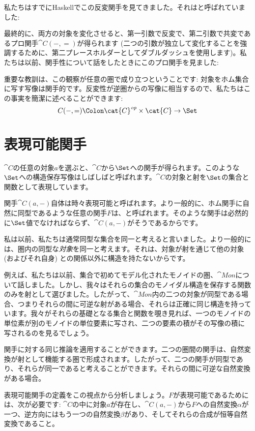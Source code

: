 私たちはすでにHaskellでこの反変関手を見てきました。それはと呼ばれていました: 


最終的に、両方の対象を変化させると、第一引数で反変で、第二引数で共変であるプロ関手$\cat{C}(-, =)$が得られます (二つの引数が独立して変化することを強調するために、第二プレースホルダーとしてダブルダッシュを使用します)。私たちは以前、関手性について話をしたときにこのプロ関手を見ました: 

重要な教訓は、この観察が任意の圏で成り立つということです: 対象をホム集合に写す写像は関手的です。反変性が逆圏からの写像に相当するので、私たちはこの事実を簡潔に述べることができます: 
\[C(-, =) \Colon \cat{C}^\mathit{op} \times \cat{C} \to \Set\]

\section{表現可能関手}

$\cat{C}$の任意の対象$a$を選ぶと、$\cat{C}$から$\Set$への関手が得られます。このような$\Set$への構造保存写像はしばしばと呼ばれます。$\cat{C}$の対象と射を$\Set$の集合と関数として表現しています。

関手$\cat{C}(a, -)$自体は時々表現可能と呼ばれます。より一般的に、ホム関手に自然に同型であるような任意の関手$F$は、と呼ばれます。そのような関手は必然的に$\Set$値でなければならず、$\cat{C}(a, -)$がそうであるからです。

私は以前、私たちは通常同型な集合を同一と考えると言いました。より一般的には、圏内の同型な\emph{対象}を同一と考えます。それは、対象が射を通じて他の対象 (およびそれ自身) との関係以外に構造を持たないからです。

例えば、私たちは以前、集合で初めてモデル化されたモノイドの圏、$\cat{Mon}$について話しました。しかし、我々はそれらの集合のモノイダル構造を保存する関数のみを射として選びました。したがって、$\cat{Mon}$内の二つの対象が同型である場合、つまりそれらの間に可逆な射がある場合、それらは正確に同じ構造を持っています。我々がそれらの基礎となる集合と関数を覗き見れば、一つのモノイドの単位素が別のモノイドの単位要素に写され、二つの要素の積がその写像の積に写されるのを見るでしょう。

関手に対する同じ推論を適用することができます。二つの圏間の関手は、自然変換が射として機能する圏で形成されます。したがって、二つの関手が同型であり、それらが同一であると考えることができます。それらの間に可逆な自然変換がある場合。

表現可能関手の定義をこの視点から分析しましょう。$F$が表現可能であるためには、次が必要です: $\cat{C}$の中に対象$a$が存在し、$\cat{C}(a, -)$から$F$への自然変換$\alpha$が一つ、逆方向にはもう一つの自然変換$\beta$があり、そしてそれらの合成が恒等自然変換であること。

